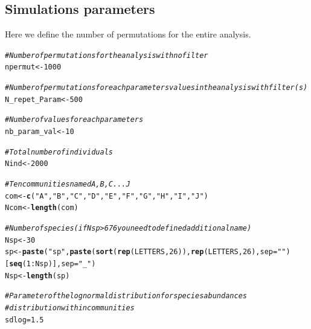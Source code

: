 \documentclass[12pt]{article}\usepackage[]{graphicx}\usepackage[]{color}
\makeatletter
\newcommand{\hlnum}[1]{\textcolor[rgb]{0.686,0.059,0.569}{#1}}%
\newcommand{\hlstr}[1]{\textcolor[rgb]{0.192,0.494,0.8}{#1}}%
\newcommand{\hlcom}[1]{\textcolor[rgb]{0.678,0.584,0.686}{\textit{#1}}}%
\newcommand{\hlopt}[1]{\textcolor[rgb]{0,0,0}{#1}}%
\newcommand{\hlstd}[1]{\textcolor[rgb]{0.345,0.345,0.345}{#1}}%
\newcommand{\hlkwb}[1]{\textcolor[rgb]{0.69,0.353,0.396}{#1}}%
\newcommand{\hlkwc}[1]{\textcolor[rgb]{0.333,0.667,0.333}{#1}}%
\newcommand{\hlkwd}[1]{\textcolor[rgb]{0.737,0.353,0.396}{\textbf{#1}}}%
\newenvironment{kframe}{%
 \def\at@end@of@kframe{}%
 \ifinner\ifhmode%
  \def\at@end@of@kframe{\end{minipage}}%
  \begin{minipage}{\columnwidth}%
 \fi\fi%
 \def\FrameCommand##1{\hskip\@totalleftmargin \hskip-\fboxsep
 \colorbox{shadecolor}{##1}\hskip-\fboxsep
     \hskip-\linewidth \hskip-\@totalleftmargin \hskip\columnwidth}%
 \MakeFramed {\advance\hsize-\width
   \@totalleftmargin\z@ \linewidth\hsize
   \@setminipage}}%
 {\par\unskip\endMakeFramed%
 \at@end@of@kframe}
\newenvironment{knitrout}{}{} %
\makeatother
\begin{document}
  
  
  
  
  
  
  \subsection{Simulations parameters}

Here we define the number of permutations for the entire analysis. 

\begin{knitrout}\small
{}\color{fgcolor}\begin{kframe}
\begin{alltt}
\hlcom{#Number of permutations for the analysis with no filter}
\hlstd{npermut} \hlkwb{<-} \hlnum{1000}

\hlcom{#Number of permutations for each parameters values in the analysis with filter(s)}
\hlstd{N_repet_Param} \hlkwb{<-} \hlnum{500}

\hlcom{#Number of values for each parameters}
\hlstd{nb_param_val} \hlkwb{<-} \hlnum{10}
\end{alltt}
\end{kframe}
\end{knitrout}

\begin{knitrout}\small
{}\color{fgcolor}\begin{kframe}
\begin{alltt}
\hlcom{#Total number of individuals}
\hlstd{Nind} \hlkwb{<-} \hlnum{2000}

\hlcom{#Ten communities named A, B, C ... J}
\hlstd{com} \hlkwb{<-} \hlkwd{c}\hlstd{(}\hlstr{"A"}\hlstd{,} \hlstr{"B"}\hlstd{,} \hlstr{"C"}\hlstd{,} \hlstr{"D"}\hlstd{,} \hlstr{"E"}\hlstd{,} \hlstr{"F"}\hlstd{,} \hlstr{"G"}\hlstd{,} \hlstr{"H"}\hlstd{,} \hlstr{"I"}\hlstd{,} \hlstr{"J"}\hlstd{)}
\hlstd{Ncom} \hlkwb{<-} \hlkwd{length}\hlstd{(com)}

\hlcom{#Number of species (if Nsp > 676 you need to defined additional name)}
\hlstd{Nsp} \hlkwb{<-} \hlnum{30}
\hlstd{sp} \hlkwb{<-} \hlkwd{paste}\hlstd{(}\hlstr{"sp"}\hlstd{,} \hlkwd{paste}\hlstd{(}\hlkwd{sort}\hlstd{(}\hlkwd{rep}\hlstd{(LETTERS,} \hlnum{26}\hlstd{)),} \hlkwd{rep}\hlstd{(LETTERS,} \hlnum{26}\hlstd{),}  \hlkwc{sep}\hlstd{=}\hlstr{""}\hlstd{)}
                  \hlstd{[}\hlkwd{seq}\hlstd{(}\hlnum{1}\hlopt{:}\hlstd{Nsp)],} \hlkwc{sep} \hlstd{=}\hlstr{"_"}\hlstd{)}
\hlstd{Nsp} \hlkwb{<-} \hlkwd{length}\hlstd{(sp)}

\hlcom{#Parameter of the log normal distribution for species abundances }
\hlcom{#distribution within communities}
\hlstd{sdlog} \hlkwb{=} \hlnum{1.5}
\end{alltt}
\end{kframe}
\end{knitrout}
\end{document}
